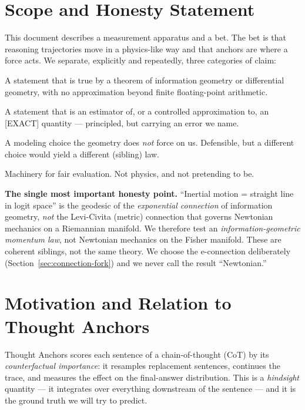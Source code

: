 \documentclass[11pt]{article}
\begin{document}
\tableofcontents

\section{Scope and Honesty Statement}

This document describes a measurement apparatus and a bet. The bet is that reasoning trajectories move in a physics-like way and that anchors are where a force acts. We separate, explicitly and repeatedly, three categories of claim:

\begin{description}[leftmargin=1.5em]
  \item[\textsf{[EXACT]}] A statement that is true by a theorem of information geometry or differential geometry, with no approximation beyond finite floating-point arithmetic.
  \item[\textsf{[DERIVED]}] A statement that is an estimator of, or a controlled approximation to, an \textsf{[EXACT]} quantity --- principled, but carrying an error we name.
  \item[\textsf{[CONVENTION]}] A modeling choice the geometry does \emph{not} force on us. Defensible, but a different choice would yield a different (sibling) law.
  \item[\textsf{[STATISTICS]}] Machinery for fair evaluation. Not physics, and not pretending to be.
\end{description}

\begin{honestbox}
\textbf{The single most important honesty point.} ``Inertial motion = straight line in logit space'' is the geodesic of the \emph{exponential connection} of information geometry, \emph{not} the Levi-Civita (metric) connection that governs Newtonian mechanics on a Riemannian manifold. We therefore test an \emph{information-geometric momentum law}, not Newtonian mechanics on the Fisher manifold. These are coherent siblings, not the same theory. We choose the e-connection deliberately (Section~\ref{sec:connection-fork}) and we never call the result ``Newtonian.''
\end{honestbox}

\section{Motivation and Relation to Thought Anchors}

Thought Anchors \cite{bogdan2025thoughtanchors} scores each sentence of a chain-of-thought (CoT) by its \emph{counterfactual importance}: it resamples replacement sentences, continues the trace, and measures the effect on the final-answer distribution. This is a \emph{hindsight} quantity --- it integrates over everything downstream of the sentence --- and it is the ground truth we will try to predict.
\end{document}
